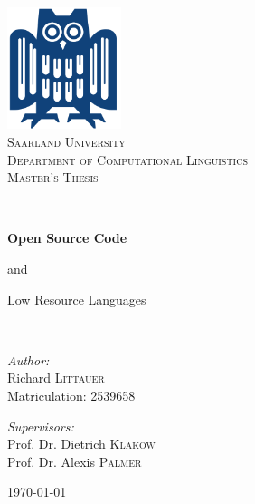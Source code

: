 \documentclass[12pt,a4paper]{article}
\author{Richard Littauer}
\begin{document}
\begin{titlepage}
	\begin{center}

		\includegraphics[width=0.25\textwidth]{img/eule.png}~\\[1cm]

		\textsc{\LARGE Saarland  University}\\[0.4cm]
		\textsc{\Large Department of Computational Linguistics}\\[1.5cm]

		\textsc{\LARGE Master's Thesis}\vspace{0.5cm}

		\HRule \\[0.55cm]

		{ \huge \bfseries Open Source Code

			 and\vspace{0.2cm}

			 Low Resource Languages}\vspace{0.5cm}

		\HRule \\[1.5cm]

		\begin{minipage}{0.45\textwidth}
			\begin{flushleft} \large
				\emph{Author:}\\
				Richard \textsc{Littauer}\\
				Matriculation: 2539658
			\end{flushleft}
		\end{minipage}
		\begin{minipage}{0.45\textwidth}
			\begin{flushright} \large
				\emph{Supervisors:} \\
				Prof. Dr. Dietrich \textsc{Klakow}\\
				Prof. Dr. Alexis \textsc{Palmer}\\
			\end{flushright}
		\end{minipage}

		\vfill

		{\large \today}

	\end{center}
\end{titlepage}
\newpage
\end{document}
